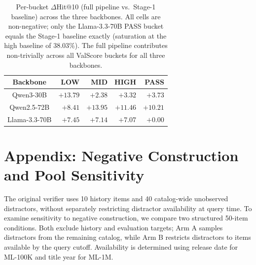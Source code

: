 \documentclass[11pt]{article}
\begin{document}
\begin{table}[h]
\centering
\small
\setlength{\tabcolsep}{5pt}
\begin{tabular}{crrrr}
\toprule
\textbf{Backbone} & \textbf{LOW} & \textbf{MID} & \textbf{HIGH} & \textbf{PASS}\\
\midrule
Qwen3-30B    & $+13.79$ & $+2.38$  & $+3.32$  & $+3.73$\\
Qwen2.5-72B  & $+8.41$  & $+13.95$ & $+11.46$ & $+10.21$\\
Llama-3.3-70B & $+7.45$  & $+7.14$  & $+7.07$  & $+0.00$\\
\bottomrule
\end{tabular}
\caption{Per-bucket $\Delta$Hit@10 (full pipeline vs.\ Stage-1 baseline) across the three backbones. All cells are non-negative; only the Llama-3.3-70B PASS bucket equals the Stage-1 baseline exactly (saturation at the high baseline of 38.03\%). The full pipeline contributes non-trivially across all ValScore buckets for all three backbones.}
\label{tab:backbone_bucket}
\end{table}

\section{Appendix: Negative Construction and Pool Sensitivity}
\label{app:negative}

The original verifier uses 10 history items and 40 catalog-wide unobserved distractors, without separately restricting distractor availability at query time. To examine sensitivity to negative construction, we compare two structured 50-item conditions. Both exclude history and evaluation targets; Arm A samples distractors from the remaining catalog, while Arm B restricts distractors to items available by the query cutoff. Availability is determined using release date for ML-100K and title year for ML-1M.

\begin{table}[h]
\centering
\small
\setlength{\tabcolsep}{3pt}
\caption{Verifier sensitivity between catalog-wide Arm A and time-available Arm B. $r$ is Pearson correlation and LOW J. is the Jaccard overlap of $V<.4$ membership.}
\label{tab:negative_arms}
\end{table}
\end{document}

